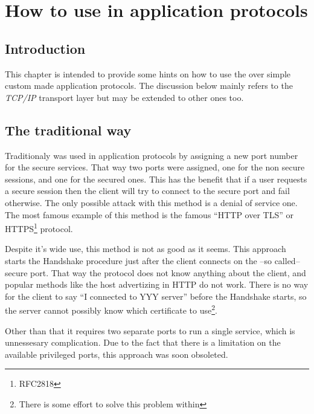 \chapter{How to use \tls{} in application protocols}
\label{apps}

\section{Introduction}
This chapter is intended to provide some hints on how to use the \tls{}
over simple custom made application protocols. 
The discussion below mainly refers to the \emph{TCP/IP} transport layer
but may be extended to other ones too.

\section{The traditional way}

Traditionaly \ssl{} was used in application protocols by assigning 
a new port number for the secure services. That way two ports were assigned, one for the
non secure sessions, and one for the secured ones. This has the benefit
that if a user requests a secure session then the client will try to
connect to the secure port and fail otherwise. The only possible attack
with this method is a denial of service one. The most famous
example of this method is the famous ``HTTP over TLS'' or HTTPS\footnote{RFC2818} 
protocol.
\par
Despite it's wide use, this method is not as good as it seems.
This approach starts the \tls{} Handshake procedure just after the
client connects on the --so called-- secure port. 
That way the \tls{} protocol does not know anything
about the client, and popular methods like the host advertizing in 
HTTP do not work. There is no way for the client to say ``I connected
to YYY server'' before the Handshake starts, so the server cannot
possibly know which certificate to use\footnote{There is some effort to solve
this problem within \tls{}}.

\par
Other than that it requires two separate ports to run a single service, which is 
unnessesary complication. Due to the fact that there is a limitation on 
the available privileged ports, this approach was soon obsoleted.



